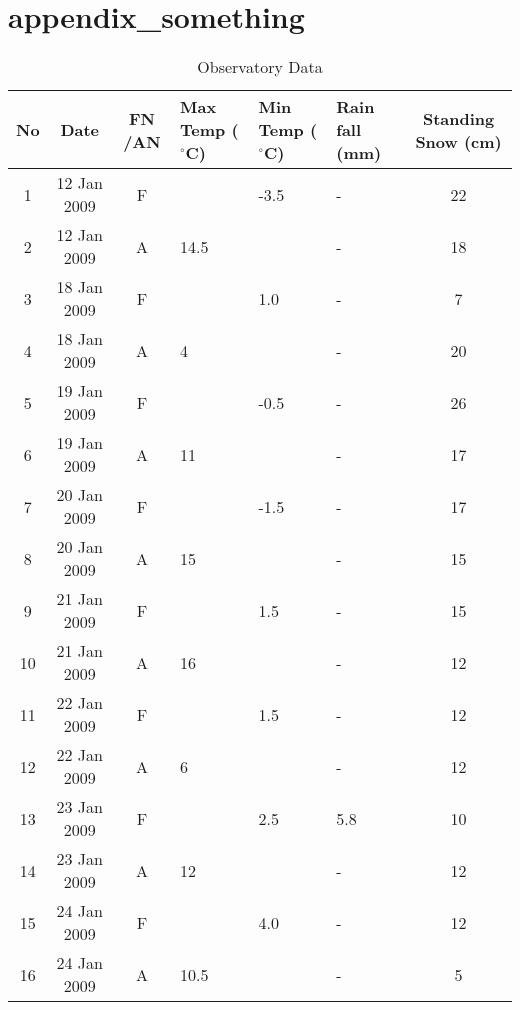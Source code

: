 \chapter{appendix_something}
\begin{table}[t]
	\caption [Observatory data during dual-pol SAR data acquisitions]{Observatory Data}
	\begin{center}
		\begin{tabular}{| c | c | c | p{1.5cm} | p{1.5cm} | p{1.5cm} | c |} \hline
			No & Date  & FN /AN  & Max Temp ($^\circ$C)  & Min Temp ($^\circ$C)  & Rain fall (mm)  & Standing Snow (cm)\\ \hline \hline
			1 & 12 Jan 2009 & F  &      & -3.5 &-  & 22\\ \hline
			2 & 12 Jan 2009 & A  & 14.5 &      &-  & 18\\ \hline 
			3 & 18 Jan 2009 & F  &      & 1.0  &-  & 7\\ \hline
			4 & 18 Jan 2009 & A  &  4   &      &-  & 20\\ \hline 
			5 & 19 Jan 2009 & F  &      & -0.5 &-  & 26\\ \hline
			6 & 19 Jan 2009 & A  &  11  &      &-  & 17\\ \hline 
			7 & 20 Jan 2009 & F  &      & -1.5 &-  & 17\\ \hline
			8 & 20 Jan 2009 & A  &  15  &      &-  & 15\\ \hline 
			9 & 21 Jan 2009 & F  &      & 1.5  &-  & 15\\ \hline
			10 & 21 Jan 2009 & A &  16  &      &-  & 12\\ \hline 
			11 & 22 Jan 2009 & F &      & 1.5  &-  & 12\\ \hline
			12 & 22 Jan 2009 & A &  6   &      &-  & 12\\ \hline 
			13 & 23 Jan 2009 & F &      & 2.5  & 5.8 & 10\\ \hline
			14 & 23 Jan 2009 & A &  12  &      &-  & 12\\ \hline 
			15 & 24 Jan 2009 & F &      & 4.0  &-  & 12\\ \hline
			16 & 24 Jan 2009 & A &  10.5&      &- & 5\\ \hline 
		\end{tabular}
	\end{center}
	\label{table:Snowfork_Data}
\end{table}